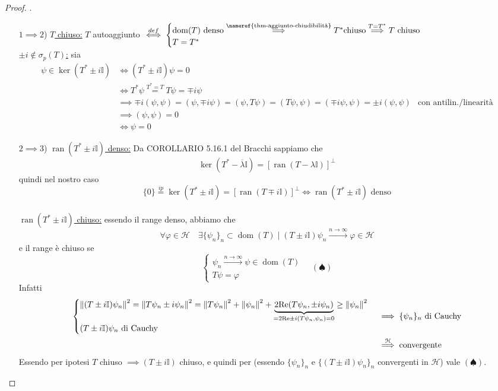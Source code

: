 \documentclass[a4paper,10pt]{article}
\theoremstyle{definition}
\DeclareMathOperator*{\ran}{ran}
\DeclareMathOperator*{\dom}{dom} %
\newcommand{\hil}{\mathcal{H}} %
\theoremstyle{indentdefinition}
\theoremstyle{indenttheorem}
\theoremstyle{myremark}
\theoremstyle{indentgeneral}
\begin{document}
\begin{proof}
    .
    \begin{itemize}
        \item[$1\implies 2$)] \underline{$T$ chiuso:} $T$ autoaggiunto $\overset{def}{\iff}\begin{cases}
            \dom(T) \text{ denso} \overset{\text{\nameref{thm-aggiunto-chiudibilità}}}{\implies} T^* \text{chiuso} \overset{T=T^*}{\implies} T \text{ chiuso}\\
            T=T^*
        \end{cases}$  \\
        \underline{$\pm i\notin\sigma_p(T)$:} sia 
        \begin{align*}
            \psi\in\ker(T^*\pm i\mathbb{I}) &\iff  (T^*\pm i\mathbb{I})\psi=0\\
            &\iff T^*\psi\overset{T^*=T}{=}T\psi =\mp i\psi \\
            &\implies \mp i(\psi,\psi)=(\psi,\mp i\psi)=(\psi,T\psi)=(T\psi,\psi)=(\mp i\psi,\psi)=\pm i(\psi,\psi) & \text{con antilin./linearità}\\
            &\implies (\psi,\psi)=0 \\
            &\iff \psi=0
        \end{align*}
        \item[$2\implies 3$)] \underline{$\ran(T^*\pm i\mathbb{I})$ denso:} Da COROLLARIO 5.16.1 del Bracchi sappiamo che 
        $$\ker(T^*-\overline{\lambda}\mathbb{I})=[\ran(T-\lambda\mathbb{I})]^\perp$$
        quindi nel nostro caso $$\{0\}\overset{ip}{=}\ker(T^*\pm i\mathbb{I})=[\ran(T\mp i\mathbb{I})]^\perp\iff \ran(T^*\pm i\mathbb{I}) \text{ denso}$$
        \\ \underline{$\ran(T^*\pm i\mathbb{I})$ chiuso:} essendo il range denso, abbiamo che $$\forall\varphi\in\hil\quad\exists\{\psi_n\}_n\subset\dom(T)\mid (T\pm i\mathbb{I})\psi_n\overset{n\to\infty}{\longrightarrow}\varphi\in \hil$$
        e il range è chiuso se $$\begin{cases}
            \psi_n\overset{n\to\infty}{\longrightarrow}\psi\in\dom(T)\\
            T\psi=\varphi 
        \end{cases}\quad (\spadesuit)$$
        Infatti
        \begin{align*}
            \begin{cases}
            \norm{(T\pm i\mathbb{I})\psi_n}^2=\norm{T\psi_n\pm i\psi_n}^2=\norm{T\psi_n}^2+\norm{\psi_n}^2+\underbrace{2\text{Re}(T\psi_n,\pm i\psi_n)}_{=2\text{Re}\pm i(T\psi_n,\psi_n)=0}\ge \norm{\psi_n}^2 \\
                (T\pm i\mathbb{I})\psi_n \text{ di Cauchy}
            \end{cases}&\implies \{\psi_n\}_n \text{ di Cauchy}\\
            &\overset{\hil}{\implies} \text{convergente}
        \end{align*}
        Essendo per ipotesi $T$ chiuso $\implies (T\pm i\mathbb{I})$ chiuso, e quindi per  (essendo $\{\psi_n\}_n$ e $\{(T\pm i \mathbb{I})\psi_n\}_n$ convergenti in $\hil$) vale $(\spadesuit)$.
        

\end{itemize}
\end{proof}
\end{document}

